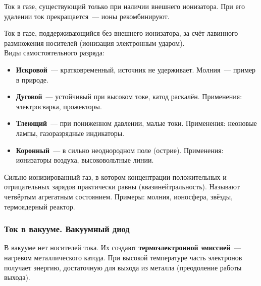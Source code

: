 \documentclass[12pt]{article}
\begin{document}
\begin{definition}
	Ток в газе, существующий только при наличии внешнего ионизатора. При его удалении ток прекращается~--- ионы рекомбинируют.
\end{definition}

\begin{definition}
	Ток в газе, поддерживающийся без внешнего ионизатора, за счёт лавинного размножения носителей (ионизация электронным ударом).\\
	Виды самостоятельного разряда:
	\begin{itemize}
		\item \textbf{Искровой}~--- кратковременный, источник не удерживает. Молния~--- пример в природе.
		\item \textbf{Дуговой}~--- устойчивый при высоком токе, катод раскалён. Применения: электросварка, прожекторы.
		\item \textbf{Тлеющий}~--- при пониженном давлении, малые токи. Применения: неоновые лампы, газоразрядные индикаторы.
		\item \textbf{Коронный}~--- в сильно неоднородном поле (острие). Применения: ионизаторы воздуха, высоковольтные линии.
	\end{itemize}
\end{definition}

\begin{definition}[Плазма]
	Сильно ионизированный газ, в котором концентрации положительных и отрицательных зарядов практически равны (квазинейтральность). Называют четвёртым агрегатным состоянием. Примеры: молния, ионосфера, звёзды, термоядерный реактор.
\end{definition}

\subsubsection{Ток в вакууме. Вакуумный диод}

В вакууме нет носителей тока. Их создают \textbf{термоэлектронной эмиссией}~--- нагревом металлического катода. При высокой температуре часть электронов получает энергию, достаточную для выхода из металла (преодоление работы выхода).
\end{document}
